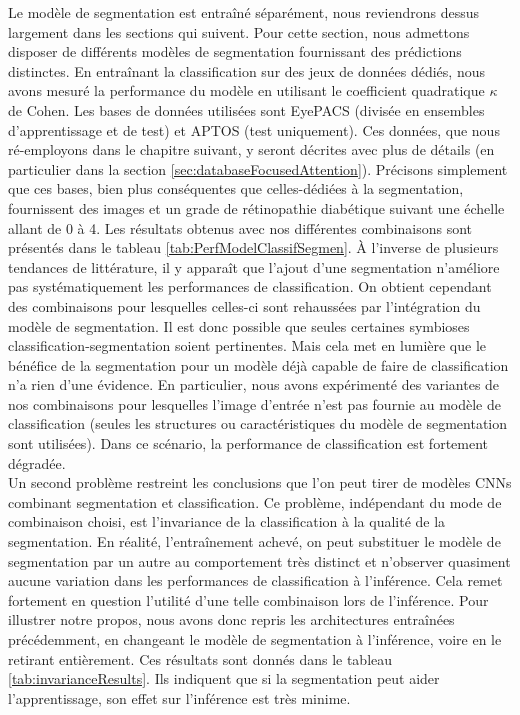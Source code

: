 Le modèle de segmentation est entraîné séparément, nous reviendrons dessus largement dans les sections qui suivent. Pour cette section, nous admettons disposer de différents modèles de segmentation fournissant des prédictions distinctes.
En entraînant la classification sur des jeux de données dédiés, nous avons mesuré la performance du modèle en utilisant le coefficient quadratique $\kappa$ de Cohen. Les bases de données utilisées sont EyePACS  \cite{cuadros_bresnick_2009} (divisée en ensembles d'apprentissage et de test) et APTOS \cite{APTOS2019Blindness2019} (test uniquement). Ces données, que nous ré-employons dans le chapitre suivant, y seront décrites avec plus de détails (en particulier dans la section \ref{sec:databaseFocusedAttention}). Précisons simplement que ces bases, bien plus conséquentes que celles-dédiées à la segmentation, fournissent des images et un grade de rétinopathie diabétique suivant une échelle allant de 0 à 4. Les résultats obtenus avec nos différentes combinaisons sont présentés dans le tableau \ref{tab:PerfModelClassifSegmen}. À l'inverse de plusieurs tendances de littérature, il y apparaît que l'ajout d'une segmentation n'améliore pas systématiquement les performances de classification. On obtient cependant des combinaisons pour lesquelles celles-ci sont rehaussées par l'intégration du modèle de segmentation.
Il est donc possible que seules certaines symbioses classification-segmentation soient pertinentes. Mais cela met en lumière que le bénéfice de la segmentation pour un modèle déjà capable de faire de classification n'a rien d'une évidence. En particulier, nous avons expérimenté des variantes de nos combinaisons pour lesquelles l'image d'entrée n'est pas fournie au modèle de classification (seules les structures ou caractéristiques du modèle de segmentation sont utilisées). Dans ce scénario, la performance de classification est fortement dégradée. \\
Un second problème restreint les conclusions que l'on peut tirer de modèles CNNs combinant segmentation et classification. Ce problème, indépendant du mode de combinaison choisi, est l'invariance de la classification à la qualité de la segmentation. En réalité, l'entraînement achevé, on peut substituer le modèle de segmentation par un autre au comportement très distinct et n'observer quasiment aucune variation dans les performances de classification à l'inférence. Cela remet fortement en question l'utilité d'une telle combinaison lors de l'inférence. Pour illustrer notre propos, nous avons donc repris les architectures entraînées précédemment, en changeant le modèle de segmentation à l'inférence, voire en le retirant entièrement. Ces résultats sont donnés dans le tableau \ref{tab:invarianceResults}. Ils indiquent que si la segmentation peut aider l'apprentissage, son effet sur l'inférence est très minime. 
